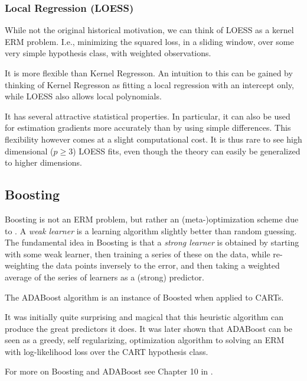 \subsubsection{Local Regression (LOESS)}
\label{sec:loess}

While not the original historical motivation, we can think of LOESS as a kernel ERM problem. 
I.e., minimizing the squared loss, in a sliding window, over some very simple hypothesis class, with weighted observations.

It is more flexible than Kernel Regresson.
An intuition to this can be gained by thinking of Kernel Regresson as fitting a local regression with an intercept only, while LOESS also allows local polynomials.

It has several attractive statistical properties. In particular, it can also be used for estimation gradients more accurately than by using simple differences. 
This flexibility however comes at a slight computational cost. 
It is thus rare to see high dimensional ($p \geq 3$) LOESS fits, even though the theory can easily be generalized to higher dimensions.




\subsection{Boosting}
\label{sec:boosting}

Boosting is not an ERM problem, but rather an (meta-)optimization scheme due to \cite{schapire_strength_1990}.
A \emph{weak learner} is a learning algorithm slightly better than random guessing. 
The fundamental idea in Boosting is that a \emph{strong learner} is obtained by starting with some weak learner, then training a series of these on the data, while re-weighting the data points inversely to the error, and then taking a weighted average of the series of learners as a (strong) predictor.

The ADABoost algorithm \citep{freund_decision-theoretic_1997} is an instance of Boosted when applied to CARTs.

It was initially quite surprising and magical that this heuristic algorithm can produce the great predictors it does. 
It was later shown that ADABoost can be seen as a greedy, self regularizing, optimization algorithm to solving an ERM with log-likelihood loss \citep{friedman_additive_2000} over the CART hypothesis class.

For more on Boosting and ADABoost see Chapter 10 in \cite{hastie_elements_2003}.



